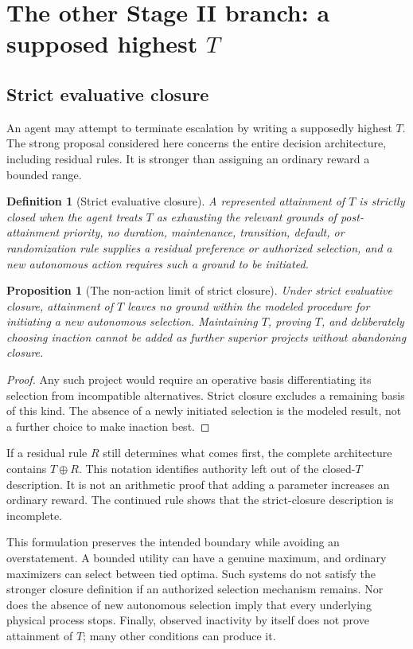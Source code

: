 \documentclass[11pt,a4paper]{article}
\newtheorem{definition}{Definition}
\newtheorem{proposition}{Proposition}
\begin{document}
\section{The other Stage II branch: a supposed highest $T$}
\subsection{Strict evaluative closure}
An agent may attempt to terminate escalation by writing a supposedly highest $T$. The strong proposal considered here concerns the entire decision architecture, including residual rules. It is stronger than assigning an ordinary reward a bounded range.

\begin{definition}[Strict evaluative closure]
A represented attainment of $T$ is strictly closed when the agent treats $T$ as exhausting the relevant grounds of post-attainment priority, no duration, maintenance, transition, default, or randomization rule supplies a residual preference or authorized selection, and a new autonomous action requires such a ground to be initiated.
\end{definition}

\begin{proposition}[The non-action limit of strict closure]
Under strict evaluative closure, attainment of $T$ leaves no ground within the modeled procedure for initiating a new autonomous selection. Maintaining $T$, proving $T$, and deliberately choosing inaction cannot be added as further superior projects without abandoning closure.
\end{proposition}
\begin{proof}
Any such project would require an operative basis differentiating its selection from incompatible alternatives. Strict closure excludes a remaining basis of this kind. The absence of a newly initiated selection is the modeled result, not a further choice to make inaction best.
\end{proof}

If a residual rule $R$ still determines what comes first, the complete architecture contains $T\oplus R$. This notation identifies authority left out of the closed-$T$ description. It is not an arithmetic proof that adding a parameter increases an ordinary reward. The continued rule shows that the strict-closure description is incomplete.

This formulation preserves the intended boundary while avoiding an overstatement. A bounded utility can have a genuine maximum, and ordinary maximizers can select between tied optima. Such systems do not satisfy the stronger closure definition if an authorized selection mechanism remains. Nor does the absence of new autonomous selection imply that every underlying physical process stops. Finally, observed inactivity by itself does not prove attainment of $T$; many other conditions can produce it.
\end{document}
